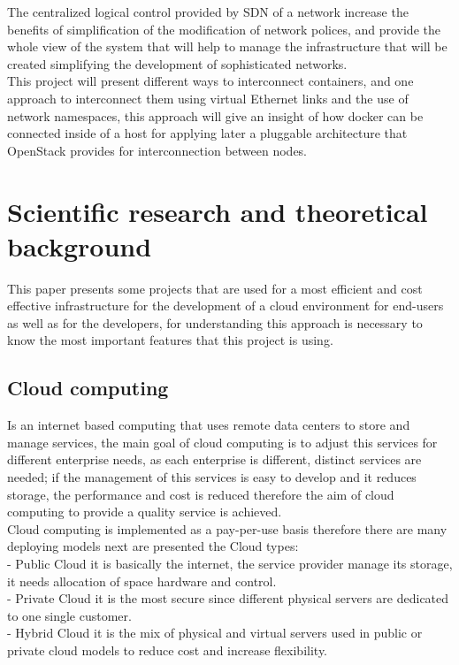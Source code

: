 The centralized logical control provided by SDN of a network increase the benefits of simplification of the modification of network polices, and provide the whole view of the system that will help to manage the infrastructure that will be created simplifying the development of sophisticated networks.\\
 
This project will present different ways to interconnect containers, and one approach to interconnect them using virtual Ethernet links and the use of network namespaces, this approach will give an insight of how docker can be connected inside of a host for applying later a pluggable architecture that OpenStack provides for interconnection between nodes.\\
 
  
\chapter{Scientific research and theoretical background} %

\label{Scientific research and theoretical background}
 
 
This paper presents some projects that are used for a most efficient and cost effective infrastructure for the development of a cloud environment for end-users as well as for the developers, for understanding this approach is necessary to know the most important features that this project is using.\\
 
\section{Cloud computing}
 
Is an internet based computing that uses remote data centers to store and manage services, the main goal of cloud computing is to adjust this services for different enterprise needs, as each enterprise is different, distinct services are needed; if the management of this services is easy to develop and it reduces storage, the performance and cost is reduced therefore the aim of cloud computing to provide a quality service is achieved.\\
 
Cloud computing is implemented as a pay-per-use basis therefore there are many deploying models next are presented the Cloud types:\\
 
- Public Cloud it is basically the internet, the service provider manage its storage, it needs allocation of space hardware and control.\\
- Private Cloud it is the most secure since different physical servers are dedicated to one single customer.\\
- Hybrid Cloud it is the mix of physical and virtual servers used in public or private cloud models to reduce cost and increase flexibility.\\
 
